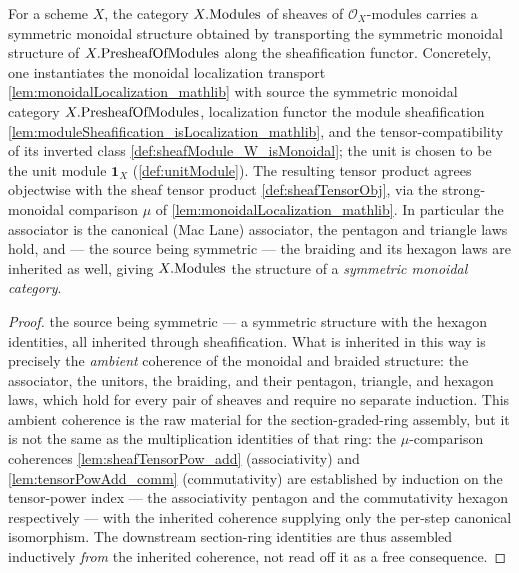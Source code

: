 \begin{definition}\leanok
  \label{def:sheafModule_monoidalStructure}
  For a scheme \(X\), the category \(X.\mathrm{Modules}\) of sheaves of
  \(\mathcal{O}_X\)-modules carries a symmetric monoidal structure obtained by
  transporting the symmetric monoidal structure of \(X.\mathrm{PresheafOfModules}\) along the
  sheafification functor. Concretely, one instantiates the monoidal localization
  transport \cref{lem:monoidalLocalization_mathlib} with source the symmetric
  monoidal category \(X.\mathrm{PresheafOfModules}\), localization functor the module sheafification
  \cref{lem:moduleSheafification_isLocalization_mathlib}, and the
  tensor-compatibility of its inverted class \cref{def:sheafModule_W_isMonoidal};
  the unit is chosen to be the unit module \(\mathbf{1}_X\) (\cref{def:unitModule}).
  The resulting tensor product agrees objectwise with the sheaf tensor product
  \cref{def:sheafTensorObj}, via the strong-monoidal comparison
  \(\mu\) of \cref{lem:monoidalLocalization_mathlib}. In particular the associator
  is the canonical (Mac Lane) associator, the pentagon and triangle laws hold, and
  --- the source being symmetric --- the braiding and its hexagon laws are
  inherited as well, giving \(X.\mathrm{Modules}\) the structure of a
  \emph{symmetric monoidal category}.
\end{definition}

\begin{proof}
  \leanok
  the source being symmetric --- a symmetric structure with the hexagon
  identities, all inherited through sheafification. What is inherited in this way
  is precisely the \emph{ambient} coherence of the monoidal and braided structure:
  the associator, the unitors, the braiding, and their pentagon, triangle, and
  hexagon laws, which hold for every pair of sheaves and require no separate
  induction. This ambient coherence is the raw material for the section-graded-ring
  assembly, but it is not the same as the multiplication identities of that ring:
  the \(\mu\)-comparison coherences \cref{lem:sheafTensorPow_add} (associativity)
  and \cref{lem:tensorPowAdd_comm} (commutativity) are established by induction on
  the tensor-power index --- the associativity pentagon and the commutativity
  hexagon respectively --- with the inherited coherence supplying only the
  per-step canonical isomorphism. The downstream section-ring identities are thus
  assembled inductively \emph{from} the inherited coherence, not read off it as a
  free consequence.
\end{proof}

